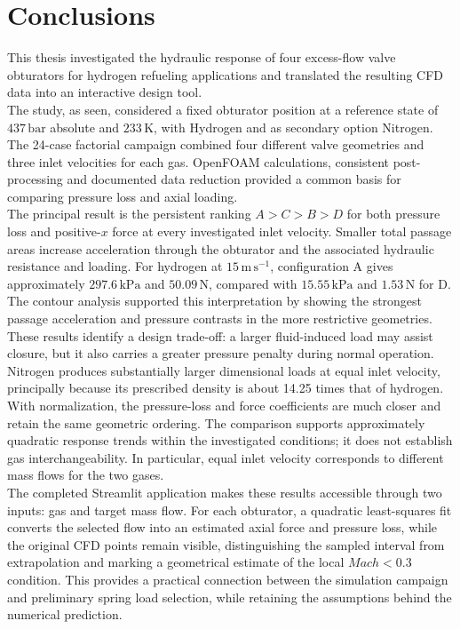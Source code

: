 \chapter{Conclusions}
\label{ch:conclusions}

This thesis investigated the hydraulic response of four excess-flow valve obturators for hydrogen refueling applications and translated the resulting CFD data into an interactive design tool.\\

The study, as seen, considered a fixed obturator position at a reference state of $437\,\mathrm{bar}$ absolute and $233\,\mathrm{K}$, with Hydrogen and as secondary option Nitrogen. The 24-case factorial campaign combined four different valve geometries and three inlet velocities for each gas. OpenFOAM calculations, consistent post-processing and documented data reduction provided a common basis for comparing pressure loss and axial loading.\\

The principal result is the persistent ranking $A>C>B>D$ for both pressure loss and positive-$x$ force at every investigated inlet velocity. Smaller total passage areas increase acceleration through the obturator and the associated hydraulic resistance and loading. For hydrogen at $15\,\mathrm{m\,s^{-1}}$, configuration A gives approximately $297.6\,\mathrm{kPa}$ and $50.09\,\mathrm{N}$, compared with $15.55\,\mathrm{kPa}$ and $1.53\,\mathrm{N}$ for D. The contour analysis supported this interpretation by showing the strongest passage acceleration and pressure contrasts in the more restrictive geometries. These results identify a design trade-off: a larger fluid-induced load may assist closure, but it also carries a greater pressure penalty during normal operation.\\

Nitrogen produces substantially larger dimensional loads at equal inlet velocity, principally because its prescribed density is about 14.25 times that of hydrogen. With normalization, the pressure-loss and force coefficients are much closer and retain the same geometric ordering. The comparison supports approximately quadratic response trends within the investigated conditions; it does not establish gas interchangeability. In particular, equal inlet velocity corresponds to different mass flows for the two gases.\\

The completed Streamlit application makes these results accessible through two inputs: gas and target mass flow. For each obturator, a quadratic least-squares fit converts the selected flow into an estimated axial force and pressure loss, while the original CFD points remain visible, distinguishing the sampled interval from extrapolation and marking a geometrical estimate of the local $Mach <0.3$ condition. This provides a practical connection between the simulation campaign and preliminary spring load selection, while retaining the assumptions behind the numerical prediction.\\

